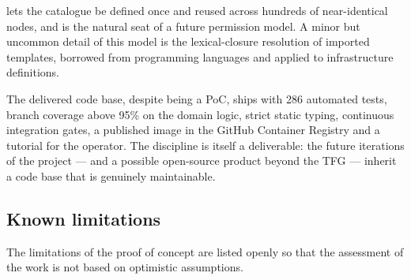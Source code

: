 \begin{description}
        lets the catalogue be defined once and reused across hundreds
        of near-identical nodes, and is the natural seat of a future
        permission model. A minor but uncommon detail of this model is
        the lexical-closure resolution of imported templates, borrowed
        from programming languages and applied to infrastructure
        definitions.
  \item[A proof of concept with full engineering discipline.]
        The delivered code base, despite being a PoC, ships with
        286 automated tests, branch coverage above 95\% on the
        domain logic, strict static typing, continuous integration
        gates, a published image in the GitHub Container Registry
        and a tutorial for the operator. The discipline is itself a
        deliverable: the future iterations of the project --- and a
        possible open-source product beyond the TFG --- inherit a code
        base that is genuinely maintainable.
\end{description}

\subsection{Known limitations}

The limitations of the proof of concept are listed openly so that
the assessment of the work is not based on optimistic assumptions.

